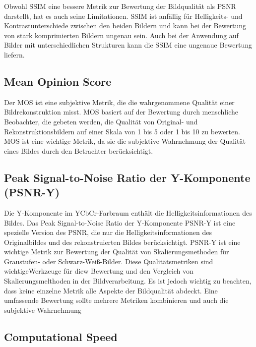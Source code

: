             Obwohl \ac{SSIM} eine bessere Metrik zur Bewertung der Bildqualität als \ac{PSNR} darstellt, hat es auch seine Limitationen.
            \ac{SSIM} ist anfällig für Helligkeits- und Kontrastunterschiede zwischen den beiden Bildern und kann bei der Bewertung von stark komprimierten Bildern ungenau sein.
            Auch bei der Anwendung auf Bilder mit unterschiedlichen Strukturen kann die \ac{SSIM} eine ungenaue Bewertung liefern.
    \subsection{Mean Opinion Score}\label{sec:mean-opinion-score}
        Der \acf{MOS} ist eine subjektive Metrik, die die wahrgenommene Qualität einer Bildrekonstruktion misst.
        MOS basiert auf der Bewertung durch menschliche Beobachter, die gebeten werden, die Qualität von Original- und Rekonstruktionsbildern auf einer Skala von 1 bis 5 oder 1 bis 10 zu bewerten.
        MOS ist eine wichtige Metrik, da sie die subjektive Wahrnehmung der Qualität eines Bildes durch den Betrachter berücksichtigt.
        
    \subsection{Peak Signal-to-Noise Ratio der Y-Komponente (PSNR-Y)}
        Die Y-Komponente im YCbCr-Farbraum enthält die Helligkeitsinformationen des Bildes. 
        Das Peak Signal-to-Noise Ratio der Y-Komponente \ac{PSNR-Y} ist eine spezielle Version des \ac{PSNR}, die nur die Helligkeitsinformationen des Originalbildes und des rekonstruierten Bildes berücksichtigt.
        \ac{PSNR}-Y ist eine wichtige Metrik zur Bewertung der Qualität von Skalierungsmethoden für Graustufen- oder Schwarz-Weiß-Bilder.
        Diese Qualitätsmetriken sind wichtigeWerkzeuge für diew Bewertung und den Vergleich von Skalierungsmelthoden in der Bildverarbeitung.
        Es ist jedoch wichtig zu beachten, dass keine einzelne Metrik alle Aspekte der Bildqualität abdeckt. Eine umfassende Bewertung sollte mehrere Metriken kombinieren und auch die subjektive Wahrnehmung 
        
    \subsection{Computational Speed}
    
